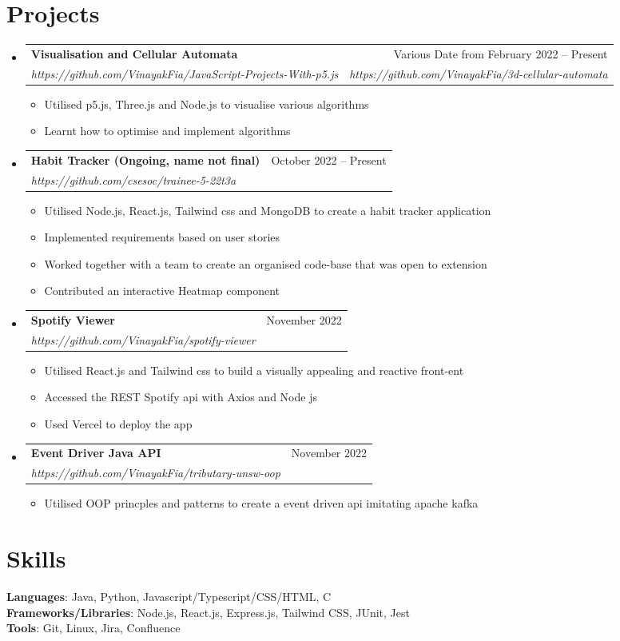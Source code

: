 \documentclass[letterpaper,10pt]{article}
\makeatletter
\newcommand{\resumeItem}[1]{
  \item{
    {#1 \vspace{-4pt}}
  }
}
\newcommand{\resumeSubheading}[4]{
  \vspace{-2pt}\item
    \begin{tabular*}{0.97\textwidth}[t]{l@{\extracolsep{\fill}}r}
      \textbf{#1} & #2 \\
      \textit{\small #3} & \textit{\small #4} \\
    \end{tabular*}\vspace{-10pt}
}
\newcommand{\resumeSubHeadingListStart}{\begin{itemize}[leftmargin=0.15in, label={}]}
\newcommand{\resumeSubHeadingListEnd}{\end{itemize}}
\newcommand{\resumeItemListStart}{\begin{itemize}}
\newcommand{\resumeItemListEnd}{\end{itemize}\vspace{-2pt}}
\makeatother
\begin{document}
\section{Projects} 
\resumeSubHeadingListStart
    \resumeSubheading
      {Visualisation and Cellular Automata}{Various Date from February 2022 -- Present}
      {https://github.com/VinayakFia/JavaScript-Projects-With-p5.js}{https://github.com/VinayakFia/3d-cellular-automata}
      \resumeItemListStart
        \small\resumeItem{Utilised p5.js, Three.js and Node.js to visualise various algorithms}
        \resumeItem{Learnt how to optimise and implement algorithms}
        \resumeItemListEnd
    \resumeSubheading
      {Habit Tracker (Ongoing, name not final)}{October 2022 -- Present}
      {https://github.com/csesoc/trainee-5-22t3a}{}
      \resumeItemListStart
        \small\resumeItem{Utilised Node.js, React.js, Tailwind css and MongoDB to create a habit tracker application}
        \resumeItem{Implemented requirements based on user stories}
        \resumeItem{Worked together with a team to create an organised code-base that was open to extension}
        \resumeItem{Contributed an interactive Heatmap component}
        \resumeItemListEnd
    \resumeSubheading
      {Spotify Viewer}{November 2022}
      {https://github.com/VinayakFia/spotify-viewer}{}
      \resumeItemListStart
        \small\resumeItem{Utilised React.js and Tailwind css to build a visually appealing and reactive 
        front-ent}
        \resumeItem{Accessed the REST Spotify api with Axios and Node js}
        \resumeItem{Used Vercel to deploy the app}
        \resumeItemListEnd
    \resumeSubheading
      {Event Driver Java API}{November 2022}
      {https://github.com/VinayakFia/tributary-unsw-oop}{}
      \resumeItemListStart
        \small\resumeItem{Utilised OOP princples and patterns to create a event driven api imitating apache kafka}
        \resumeItemListEnd
    

\resumeSubHeadingListEnd

\section{Skills}
\begin{itemize}[leftmargin=0.15in, label={}]
    \normalsize{\item{
 \textbf{Languages}{: Java, Python, Javascript/Typescript/CSS/HTML, C} \\
 \textbf{Frameworks/Libraries}{: Node.js, React.js, Express.js, Tailwind CSS, JUnit, Jest} \\
 \textbf{Tools}{: Git, Linux, Jira, Confluence} \\
    }}
 \end{itemize}
\end{document}
